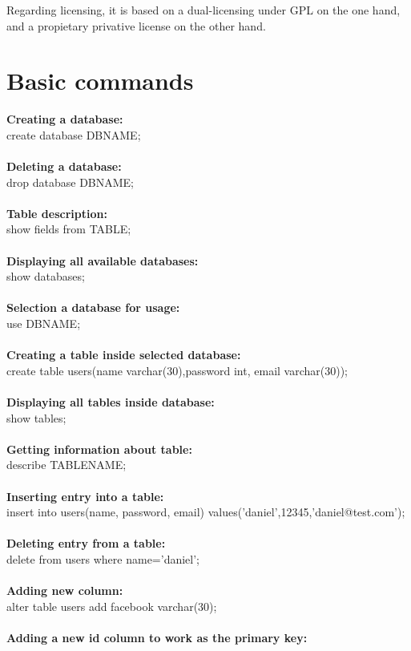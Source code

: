 \documentclass[11pt]{article}
\begin{document}
Regarding licensing, it is based on a dual-licensing under GPL on the one hand, and a propietary privative license on the other hand. 

\section{Basic commands}

\textbf{Creating a database:\\}
create database DBNAME;\\
\\
\textbf{Deleting a database:\\}
drop database DBNAME;\\
\\
\textbf{Table description:\\}
show fields from TABLE;\\
\\
\textbf{Displaying all available databases:\\}
show databases;\\
\\
\textbf{Selection a database for usage:\\}
use DBNAME;\\
\\
\textbf{Creating a table inside selected database:\\}
create table users(name varchar(30),password int, email varchar(30));\\
\\
\textbf{Displaying all tables inside database:\\}
show tables;\\
\\
\textbf{Getting information about table:\\}
describe TABLENAME;\\
\\
\textbf{Inserting entry into a table:\\}
insert into users(name, password, email) values('daniel',12345,'daniel@test.com');\\
\\
\textbf{Deleting entry from a table:\\}
delete from users where name='daniel';\\
\\
\textbf{Adding new column:\\}
alter table users add facebook varchar(30);\\
\\
\textbf{Adding a new id column to work as the primary key:\\}
\end{document}
